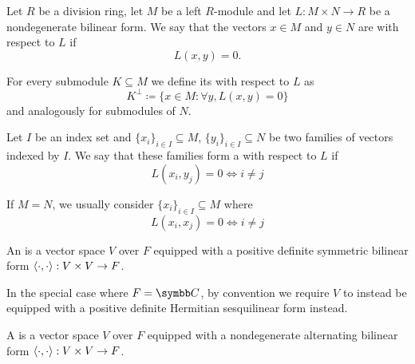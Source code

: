 \begin{definition}\label{def:orthogonality}
  Let \( R \) be a division ring, let \( M \) be a left \( R \)-module and let \( L: M \times N \to R \) be a nondegenerate bilinear form. We say that the vectors \( x \in M \) and \( y \in N \) are  with respect to \( L \) if
  \begin{equation*}
    L(x, y) = 0.
  \end{equation*}

  For every submodule \( K \subseteq M \) we define its  with respect to \( L \) as
  \begin{equation*}
    K^\perp \coloneqq \{ x \in M \colon \forall y, L(x, y) = 0 \}
  \end{equation*}
  and analogously for submodules of \( N \).

  Let \( I \) be an index set and \( \{ x_i \}_{i \in I} \subseteq M \), \( \{ y_i \}_{i \in I} \subseteq N \) be two families of vectors indexed by \( I \). We say that these families form a  with respect to \( L \) if
  \begin{equation*}
    L(x_i, y_j) = 0 \iff i \neq j
  \end{equation*}

  If \( M = N \), we usually consider  \( \{ x_i \}_{i \in I} \subseteq M \) where
  \begin{equation*}
    L(x_i, x_j) = 0 \iff i \neq j
  \end{equation*}
\end{definition}

\begin{definition}\label{def:inner_product_space}
  An  is a vector space \( V \) over \( F \) equipped with a positive definite symmetric bilinear form \( \left\langle \cdot, \cdot \right\rangle: V \times V \to F \).

  In the special case where \( F = \BC \), by convention we require \( V \) to instead be equipped with a positive definite Hermitian sesquilinear form instead.
\end{definition}

\begin{definition}\label{def:symplectic_vector_space}
  A  is a vector space \( V \) over \( F \) equipped with a nondegenerate  alternating bilinear form \( \left\langle \cdot, \cdot \right\rangle: V \times V \to F \).
\end{definition}

